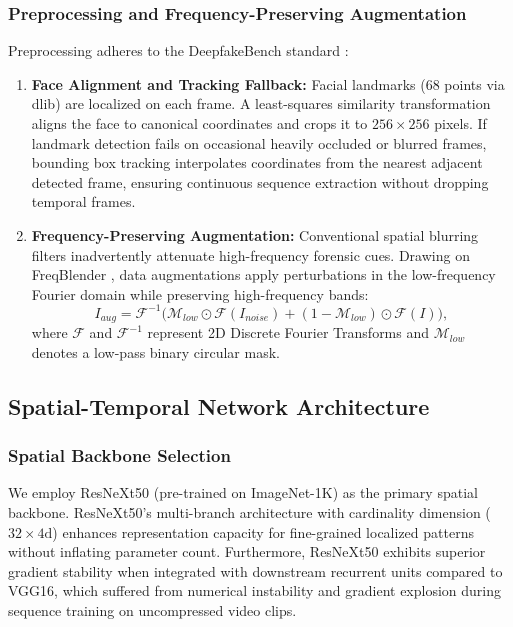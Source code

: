 \subsubsection{Preprocessing and Frequency-Preserving Augmentation}
Preprocessing adheres to the DeepfakeBench standard \citep{Yan2023DeepfakeBench}:
\begin{enumerate}
    \item \textbf{Face Alignment and Tracking Fallback:} Facial landmarks (68 points via dlib) are localized on each frame. A least-squares similarity transformation aligns the face to canonical coordinates and crops it to $256 \times 256$ pixels. If landmark detection fails on occasional heavily occluded or blurred frames, bounding box tracking interpolates coordinates from the nearest adjacent detected frame, ensuring continuous sequence extraction without dropping temporal frames.
    \item \textbf{Frequency-Preserving Augmentation:} Conventional spatial blurring filters inadvertently attenuate high-frequency forensic cues. Drawing on FreqBlender \citep{Huang2024FreqBlender}, data augmentations apply perturbations in the low-frequency Fourier domain while preserving high-frequency bands:
    \begin{equation}
        I_{aug} = \mathcal{F}^{-1}\Big( \mathcal{M}_{low} \odot \mathcal{F}(I_{noise}) + (1 - \mathcal{M}_{low}) \odot \mathcal{F}(I) \Big),
    \end{equation}
    where $\mathcal{F}$ and $\mathcal{F}^{-1}$ represent 2D Discrete Fourier Transforms and $\mathcal{M}_{low}$ denotes a low-pass binary circular mask.
\end{enumerate}

\subsection{Spatial-Temporal Network Architecture}

\subsubsection{Spatial Backbone Selection}
We employ ResNeXt50 (pre-trained on ImageNet-1K) as the primary spatial backbone. ResNeXt50's multi-branch architecture with cardinality dimension ($32 \times 4\text{d}$) enhances representation capacity for fine-grained localized patterns without inflating parameter count. Furthermore, ResNeXt50 exhibits superior gradient stability when integrated with downstream recurrent units compared to VGG16, which suffered from numerical instability and gradient explosion during sequence training on uncompressed video clips.

